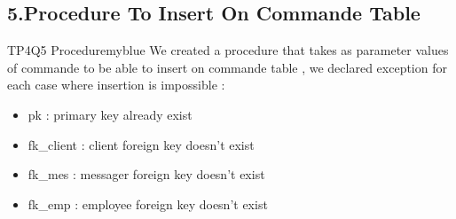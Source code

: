 \newpage
\subsection*{5.Procedure To Insert On Commande Table}


\begin{prettyBox}{TP4Q5 Procedure}{myblue}
We created a procedure that takes as parameter values of commande to be able to insert on commande table ,
we declared exception for each case where insertion is impossible :
\begin{itemize}
    \item pk : primary key already exist 
    \item fk\_client : client foreign key doesn't exist
    \item fk\_mes : messager foreign key doesn't exist
    \item fk\_emp : employee foreign key doesn't exist
\end{itemize}
\end{prettyBox}

\vspace{0.25cm}
